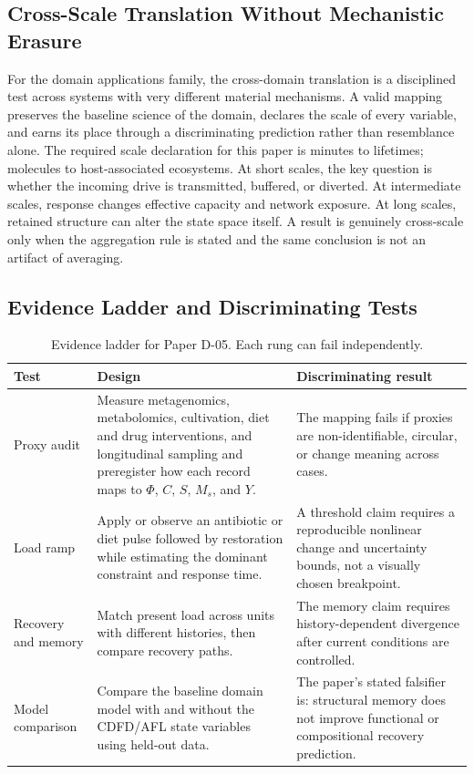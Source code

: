 \documentclass[11pt,a4paper]{article}
\begin{document}
\subsection{Cross-Scale Translation Without Mechanistic Erasure}

For the domain applications family, the cross-domain translation is a disciplined test across systems with very different material mechanisms. A valid mapping preserves the baseline science of the domain, declares the scale of every variable, and earns its place through a discriminating prediction rather than resemblance alone. \cite{Holling1973,Turing1952,Shannon1948,BakTangWiesenfeld1987}
The required scale declaration for this paper is minutes to lifetimes; molecules to host-associated ecosystems. At short
scales, the key question is whether the incoming drive is transmitted,
buffered, or diverted. At intermediate scales, response changes effective
capacity and network exposure. At long scales, retained structure can alter the
state space itself. A result is genuinely cross-scale only when the aggregation
rule is stated and the same conclusion is not an artifact of averaging.

\subsection{Evidence Ladder and Discriminating Tests}

\begin{table}[htbp]
\centering
\small
\caption{Evidence ladder for Paper D-05. Each rung can fail independently.}
\begin{tabularx}{\textwidth}{|p{}|X|X|}
\hline
\textbf{Test} & \textbf{Design} & \textbf{Discriminating result} \\
\hline
Proxy audit & Measure metagenomics, metabolomics, cultivation, diet and drug interventions, and longitudinal sampling and preregister how each record maps to $\Phi$, $C$, $S$, $M_s$, and $Y$. & The mapping fails if proxies are non-identifiable, circular, or change meaning across cases. \\
\hline
Load ramp & Apply or observe an antibiotic or diet pulse followed by restoration while estimating the dominant constraint and response time. & A threshold claim requires a reproducible nonlinear change and uncertainty bounds, not a visually chosen breakpoint. \\
\hline
Recovery and memory & Match present load across units with different histories, then compare recovery paths. & The memory claim requires history-dependent divergence after current conditions are controlled. \\
\hline
Model comparison & Compare the baseline domain model with and without the CDFD/AFL state variables using held-out data. & The paper's stated falsifier is: structural memory does not improve functional or compositional recovery prediction. \\
\hline
\end{tabularx}
\end{table}
\end{document}
